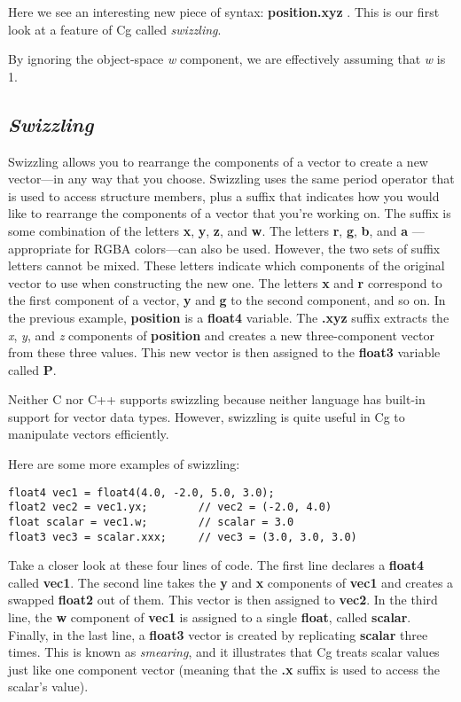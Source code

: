 \documentclass[../main.tex]{subfiles}
\begin{document}
Here we see an interesting new piece of syntax: \textbf{position.xyz} . This is our first look at a feature of Cg called \textit{swizzling}.

By ignoring the object-space \textit{w} component, we are effectively assuming that \textit{w} is 1.

\subsection*{\textit{Swizzling}}

Swizzling allows you to rearrange the components of a vector to create a new vector—in any way that you choose. Swizzling uses the same period operator that is used to access structure members, plus a suffix that indicates how you would like to rearrange the components of a vector that you're working on. The suffix is some combination of the letters \textbf{x}, \textbf{y}, \textbf{z}, and \textbf{w}. The letters \textbf{r}, \textbf{g}, \textbf{b}, and \textbf{a} —appropriate for RGBA colors—can also be used. However, the two sets of suffix letters cannot be mixed. These letters indicate which components of the original vector to use when constructing the new one. The letters \textbf{x} and \textbf{r} correspond to the first component of a vector, \textbf{y} and \textbf{g} to the second component, and so on. In the previous example, \textbf{position} is a \textbf{float4} variable. The \textbf{.xyz} suffix extracts the \textit{x}, \textit{y}, and \textit{z} components of \textbf{position} and creates a new three-component vector from these three values. This new vector is then assigned to the \textbf{float3} variable called \textbf{P}.

Neither C nor C++ supports swizzling because neither language has built-in support for vector data types. However, swizzling is quite useful in Cg to manipulate vectors efficiently.

Here are some more examples of swizzling:

\FloatBarrier
\begin{lstlisting}
float4 vec1 = float4(4.0, -2.0, 5.0, 3.0);
float2 vec2 = vec1.yx;        // vec2 = (-2.0, 4.0)
float scalar = vec1.w;        // scalar = 3.0
float3 vec3 = scalar.xxx;     // vec3 = (3.0, 3.0, 3.0)
\end{lstlisting}
\FloatBarrier

Take a closer look at these four lines of code. The first line declares a \textbf{float4} called \textbf{vec1}. The second line takes the \textbf{y} and \textbf{x} components of \textbf{vec1} and creates a swapped \textbf{float2} out of them. This vector is then assigned to \textbf{vec2}. In the third line, the \textbf{w} component of \textbf{vec1} is assigned to a single \textbf{float}, called \textbf{scalar}. Finally, in the last line, a \textbf{float3} vector is created by replicating \textbf{scalar} three times. This is known as \textit{smearing}, and it illustrates that Cg treats scalar values just like one component vector (meaning that the \textbf{.x} suffix is used to access the scalar's value).
\end{document}
